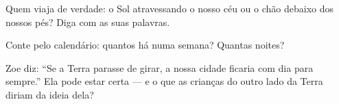 \begin{exercise}[$\star$]\label{exo:g1:day-and-night:7}
Quem viaja de verdade: o Sol atravessando o nosso céu ou o chão
debaixo dos nossos pés? Diga com as suas palavras.
\end{exercise}

\begin{exercise}[$\star$]\label{exo:g1:day-and-night:8}
Conte pelo calendário: quantos  há numa semana?
Quantas noites?
\end{exercise}

\begin{exercise}[$\star\star$]\label{exo:g1:day-and-night:9}
Zoe diz: ``Se a Terra parasse de girar, a nossa cidade ficaria com
dia para sempre.'' Ela pode estar certa --- e o que as crianças do
outro lado da Terra diriam da ideia dela?
\end{exercise}
